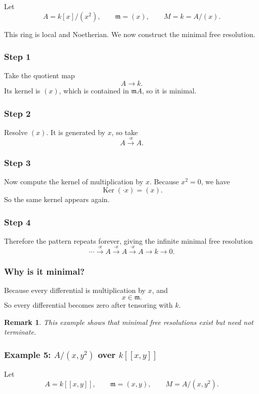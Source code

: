 \documentclass[12pt,a4paper]{article}
\theoremstyle{notespace}
\newtheorem{remark}{Remark}[section]
\DeclareMathOperator{\Ker}{Ker}
\newcommand{\m}{\mathfrak m}
\begin{document}
Let
\[
A=k[x]/(x^2),\qquad \m=(x),\qquad M=k=A/(x).
\]

This ring is local and Noetherian. We now construct the minimal free resolution.

\subsubsection*{Step 1}
Take the quotient map
\[
A\to k.
\]
Its kernel is \((x)\), which is contained in \(\m A\), so it is minimal.

\subsubsection*{Step 2}
Resolve \((x)\). It is generated by \(x\), so take
\[
A\xrightarrow{\cdot x}A.
\]

\subsubsection*{Step 3}
Now compute the kernel of multiplication by \(x\). Because \(x^2=0\), we have
\[
\Ker(\cdot x)=(x).
\]
So the same kernel appears again.

\subsubsection*{Step 4}
Therefore the pattern repeats forever, giving the infinite minimal free resolution
\[
\cdots \xrightarrow{\cdot x} A \xrightarrow{\cdot x} A \xrightarrow{\cdot x} A \longrightarrow k \longrightarrow 0.
\]

\subsubsection*{Why is it minimal?}
Because every differential is multiplication by \(x\), and
\[
x\in \m.
\]
So every differential becomes zero after tensoring with \(k\).

\begin{remark}
	This example shows that minimal free resolutions exist but need not terminate.
\end{remark}

\subsubsection{Example 5: \(A/(x,y^2)\) over \(k[[x,y]]\)}

Let
\[
A=k[[x,y]],\qquad \m=(x,y),\qquad M=A/(x,y^2).
\]
\end{document}

